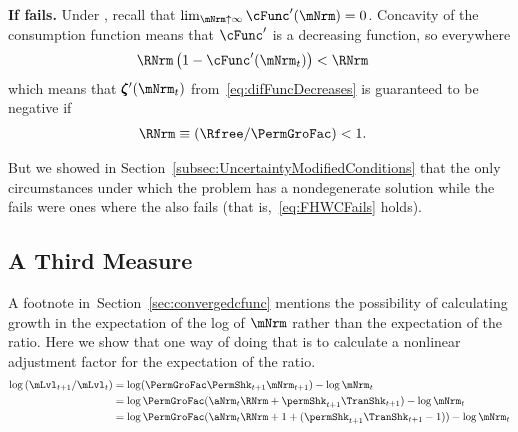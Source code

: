\documentclass[\econtexRoot/BufferStockTheory]{subfiles}
\begin{document}
\textbf{If {\RIC} fails.}
Under \cncl{\RIC}, recall that $\lim_{\mNrm \uparrow \infty} \cFunc^{\prime}(\mNrm) = 0$.  Concavity of the consumption function means that $\cFunc^{\prime}$ is a decreasing function, so everywhere 
\begin{align*}
  \RNrm\left(1-\cFunc^{\prime}({\mNrm}_t)\right) & < \RNrm
\end{align*}
which means that $\difFunc^{\prime}(\mNrm_{t})$ from~\eqref{eq:difFuncDecreases} is guaranteed to be negative if
\begin{align}
  \RNrm \equiv (\Rfree/\PermGroFac) & < 1  \label{eq:FHWCFails}.
\end{align}

But we showed in Section~\ref{subsec:UncertaintyModifiedConditions} that the only circumstances under which the problem has a nondegenerate solution while the {\RIC} fails were ones where the {\FHWC} also fails (that is,~\eqref{eq:FHWCFails} holds).

\subsection{A Third Measure}

A footnote in~Section~\ref{sec:convergedcfunc} mentions the possibility of calculating growth in the expectation of the log of $\mNrm$ rather than the expectation of the ratio.  Here we show that one way of doing that is to calculate a nonlinear adjustment factor for the expectation of the ratio.
\begin{align*}
\log \left(\mLvl_{t+1}/\mLvl_{t}\right) & = \log (\PermGroFac \PermShk_{t+1} \mNrm_{t+1})- \log \mNrm_{t} 
\\ & = \log \PermGroFac (\aNrm_{t}\RNrm+\permShk_{t+1}\TranShk_{t+1})- \log \mNrm_{t} 
\\ & = \log \PermGroFac (\aNrm_{t}\RNrm+1+(\permShk_{t+1}\TranShk_{t+1}-1))- \log \mNrm_{t}
\end{align*}
\end{document}

